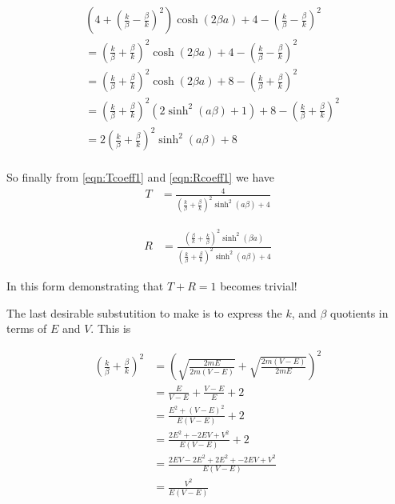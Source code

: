 \documentclass{article}
\begin{document}
\begin{align*}
&\left(4 + \left( \frac{k}{\beta} -\frac{\beta}{k} \right)^2 \right)
\cosh(2\beta a)
+ 
4 - \left(\frac{k}{\beta} - \frac{\beta}{k} \right)^2  \\
&=
\left( \frac{k}{\beta} +\frac{\beta}{k} \right)^2 
\cosh(2\beta a)
+ 
4 - \left(\frac{k}{\beta} - \frac{\beta}{k} \right)^2  \\
&=
\left( \frac{k}{\beta} +\frac{\beta}{k} \right)^2 
\cosh(2\beta a)
+ 
8 - \left(\frac{k}{\beta} + \frac{\beta}{k} \right)^2  \\
&=
\left( \frac{k}{\beta} +\frac{\beta}{k} \right)^2 
\left( 2 \sinh^2(a \beta) + 1\right)
+ 
8 - \left(\frac{k}{\beta} + \frac{\beta}{k} \right)^2  \\
&=
2 \left( \frac{k}{\beta} +\frac{\beta}{k} \right)^2 
\sinh^2(a \beta) + 8 \\
\end{align*}

So finally from \ref{eqn:Tcoeff1} and \ref{eqn:Rcoeff1} we have
\begin{align}
T 
&= \frac{4} { 
\left( \frac{k}{\beta} +\frac{\beta}{k} \right)^2 
\sinh^2(a \beta) + 4
}
\end{align}

\begin{align}
R 
&= \frac{ 
\left(\frac{\beta}{k} + \frac{k}{\beta} \right)^2 
\sinh^2( \beta a)} { 
\left( \frac{k}{\beta} +\frac{\beta}{k} \right)^2 
\sinh^2(a \beta) + 4 
}
\end{align}

In this form demonstrating that $T + R=1$ becomes trivial!

The last desirable substutition to make is to express the $k$, and $\beta$ quotients in terms of $E$ and $V$.  This is

\begin{align*}
\left(\frac{k}{\beta} + \frac{\beta}{k}\right)^2
&=
\left(\sqrt{\frac{2mE}{2m(V-E)}} + \sqrt{\frac{2m(V-E)}{2mE}}\right)^2 \\
&=
\frac{E}{V-E} + \frac{V-E}{E} + 2 \\
&=
\frac{E^2 + (V-E)^2}{E(V-E)} + 2 \\
&=
\frac{2E^2 + -2 E V + V^2 }{E(V-E)} + 2 \\
&=
\frac{2 EV -2 E^2 + 2E^2 + -2 E V + V^2 }{E(V-E)} \\
&=
\frac{V^2 }{E(V-E)} \\
\end{align*}
\end{document}
